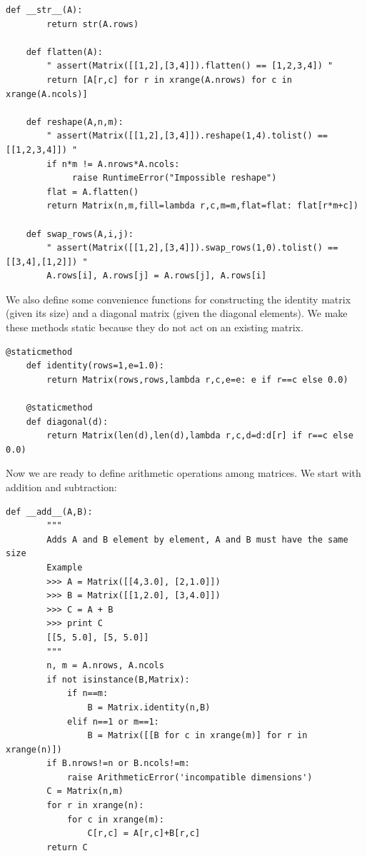 \documentclass[justified,sixbynine]{tufte-book}
\def\ft{\small\tt}
\theoremstyle{plain}%
\theoremstyle{definition}
\theoremstyle{remark}
\begin{document}
\begin{fullwidth}
\begin{lstlisting}[caption={in file: {\ft nlib.py}}]
    def __str__(A):
        return str(A.rows)

    def flatten(A):
        " assert(Matrix([[1,2],[3,4]]).flatten() == [1,2,3,4]) "
        return [A[r,c] for r in xrange(A.nrows) for c in xrange(A.ncols)]

    def reshape(A,n,m):
        " assert(Matrix([[1,2],[3,4]]).reshape(1,4).tolist() == [[1,2,3,4]]) "
        if n*m != A.nrows*A.ncols:
             raise RuntimeError("Impossible reshape")
        flat = A.flatten()
        return Matrix(n,m,fill=lambda r,c,m=m,flat=flat: flat[r*m+c])

    def swap_rows(A,i,j):
        " assert(Matrix([[1,2],[3,4]]).swap_rows(1,0).tolist() == [[3,4],[1,2]]) "
        A.rows[i], A.rows[j] = A.rows[j], A.rows[i]
\end{lstlisting}


We also define some convenience functions for constructing the identity matrix (given its size) and a diagonal matrix (given the diagonal elements). We make these methods static because they do not act on an existing matrix.

\begin{lstlisting}[caption={in file: {\ft nlib.py}}]
    @staticmethod
    def identity(rows=1,e=1.0):
        return Matrix(rows,rows,lambda r,c,e=e: e if r==c else 0.0)

    @staticmethod
    def diagonal(d):
        return Matrix(len(d),len(d),lambda r,c,d=d:d[r] if r==c else 0.0)
\end{lstlisting}

Now we are ready to define arithmetic operations among matrices. We start with addition and subtraction:


\begin{lstlisting}[caption={in file: {\ft nlib.py}}]
    def __add__(A,B):
        """
        Adds A and B element by element, A and B must have the same size
        Example
        >>> A = Matrix([[4,3.0], [2,1.0]])
        >>> B = Matrix([[1,2.0], [3,4.0]])
        >>> C = A + B
        >>> print C
        [[5, 5.0], [5, 5.0]]
        """
        n, m = A.nrows, A.ncols
        if not isinstance(B,Matrix):
            if n==m:
                B = Matrix.identity(n,B)
            elif n==1 or m==1:
                B = Matrix([[B for c in xrange(m)] for r in xrange(n)])
        if B.nrows!=n or B.ncols!=m:
            raise ArithmeticError('incompatible dimensions')
        C = Matrix(n,m)
        for r in xrange(n):
            for c in xrange(m):
                C[r,c] = A[r,c]+B[r,c]
        return C


\end{lstlisting}
\end{fullwidth}
\end{document}
